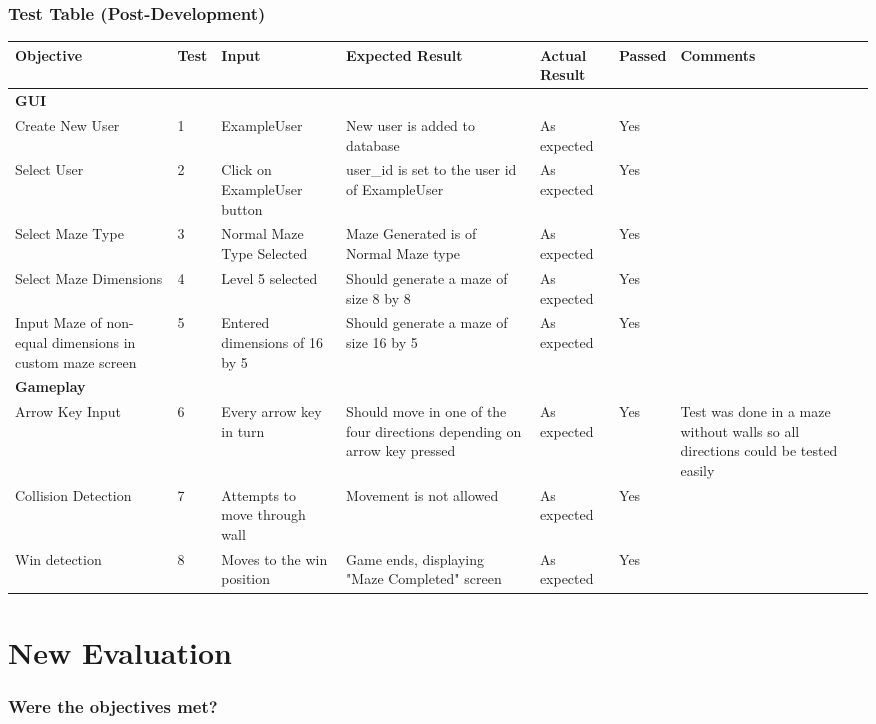 \documentclass{article}
\begin{document}
\section{Test Table (Post-Development)}
\begin{tabular}{|P{3cm}|P{1cm}|P{3cm}|P{3cm}|P{3cm}|P{1.2cm}|P{2cm}| }
\hline
 Objective & Test & Input & Expected Result & Actual Result & Passed & Comments \\
\hline
\textbf{GUI }&&&&&& \\
\hline
 Create New User & 1 & ExampleUser & New user is added to database & As expected & Yes & \\
\hline
Select User & 2 & Click on ExampleUser button & user\_id is set to the user id of ExampleUser & As expected & Yes & \\
\hline
 Select Maze Type & 3 & Normal Maze Type Selected & Maze Generated is of Normal Maze type & As expected & Yes & \\
\hline
 Select Maze Dimensions & 4 & Level 5 selected & Should generate a maze of size 8 by 8 & As expected & Yes & \\
\hline
 Input Maze of non-equal dimensions in custom maze screen & 5 & Entered dimensions of 16 by 5 & Should generate a maze of size 16 by 5 & As expected & Yes & \\
\hline
\textbf{Gameplay}&&&&&& \\
\hline
 Arrow Key Input & 6 & Every arrow key in turn & Should move in one of the four directions depending on arrow key pressed & As expected & Yes & Test was done in a maze without walls so all directions could be tested easily\\
\hline
 Collision Detection & 7 & Attempts to move through wall & Movement is not allowed & As expected & Yes & \\
\hline
 Win detection & 8 & Moves to the win position & Game ends, displaying "Maze Completed" screen & As expected & Yes & \\
\hline
\end{tabular}


\clearpage
\part{New Evaluation}
\section{Were the objectives met?}
\end{document}

